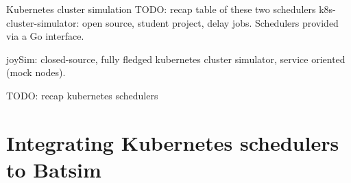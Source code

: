 \documentclass[12pt, aspectratio=43]{beamer}
\begin{document}
%
%

\begin{frame}{Kubernetes cluster simulation}
	TODO: recap table of these two schedulers
	k8s-cluster-simulator: open source, student project, delay jobs.
	Schedulers provided via a Go interface.

	joySim: closed-source, fully fledged kubernetes cluster simulator,
	service oriented (mock nodes).

	TODO: recap kubernetes schedulers 

\end{frame}

\section{Integrating Kubernetes schedulers to Batsim}
\end{document}
